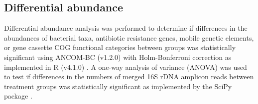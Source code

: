 \subsection{Differential abundance}

Differential abundance analysis was performed to determine if differences in the abundances of bacterial taxa, antibiotic resistance genes, mobile genetic elements, or gene cassette COG functional categories between groups was statistically significant using ANCOM-BC (v1.2.0) with Holm-Bonferroni correction as implemented in R (v4.1.0) \parencite{RCoreTeam.2021, Lin.2020}.
A one-way analysis of variance (ANOVA) was used to test if differences in the numbers of merged 16S rDNA amplicon reads between treatment groups was statistically significant as implemented by the SciPy package \parencite{PauliVirtanen.2020}.
